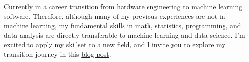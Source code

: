 

\begin{cvparagraph}

Currently in a career transition from hardware engineering to machine learning software. Therefore, although many of my previous experiences are not in machine learning, my fundamental skills in math, statistics, programming, and data analysis are directly transferable to machine learning and data science. I'm excited to apply my skillset to a new field, and I invite you to explore my transition journey in this \href{https://medium.com/@mpchang17/making-the-leap-from-hardware-to-machine-learning-d85853b59a05}{blog post}.
\end{cvparagraph}

